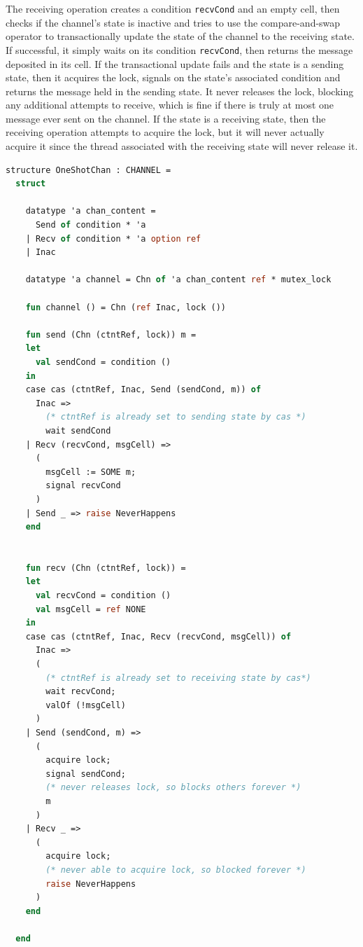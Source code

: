 \documentclass[letterpaper, 11pt]{extarticle}
\begin{document}
The receiving operation creates a condition \lstinline{recvCond} and an empty cell,
then checks if the channel's state is inactive and tries to use the
compare-and-swap operator to transactionally update the state of the channel to
the receiving state.  If successful, it simply waits on its condition \lstinline{recvCond},
then returns the message deposited in its cell.
If the transactional update fails and the state is a sending state,
then it acquires the lock, signals on the state's associated condition and returns the message
held in the sending state.  It never releases the lock, blocking any additional attempts to receive,
which is fine if there is truly at most one message ever sent on the channel.
If the state is a receiving state, then the receiving operation attempts to acquire the lock,
but it will never actually acquire it since the thread associated with the receiving state will
never release it.


\begin{lstlisting}[language=ML, mathescape]
  structure OneShotChan : CHANNEL =
  struct

    datatype 'a chan_content =
      Send of condition * 'a
    | Recv of condition * 'a option ref
    | Inac  

    datatype 'a channel = Chn of 'a chan_content ref * mutex_lock

    fun channel () = Chn (ref Inac, lock ())

    fun send (Chn (ctntRef, lock)) m =
    let
      val sendCond = condition ()
    in
    case cas (ctntRef, Inac, Send (sendCond, m)) of
      Inac =>
        (* ctntRef is already set to sending state by cas *)
        wait sendCond
    | Recv (recvCond, msgCell) =>
      (
        msgCell := SOME m;
        signal recvCond
      )
    | Send _ => raise NeverHappens
    end


    fun recv (Chn (ctntRef, lock)) =
    let
      val recvCond = condition ()
      val msgCell = ref NONE 
    in
    case cas (ctntRef, Inac, Recv (recvCond, msgCell)) of
      Inac =>
      (
        (* ctntRef is already set to receiving state by cas*)
        wait recvCond;
        valOf (!msgCell)
      )
    | Send (sendCond, m) =>
      (
        acquire lock;
        signal sendCond;
        (* never releases lock, so blocks others forever *)
        m
      )
    | Recv _ =>
      (
        acquire lock;
        (* never able to acquire lock, so blocked forever *)
        raise NeverHappens
      )
    end

  end
\end{lstlisting}
\end{document}
